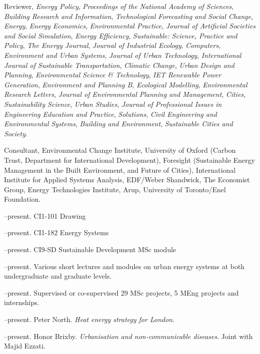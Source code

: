 \documentclass[11pt,a4paper]{article}
\begin{document}
\ind Reviewer, \emph{Energy Policy}, \emph{Proceedings of the National Academy of Sciences}, \emph{Building Research and Information}, \emph{Technological Forecasting and Social Change}, \emph{Energy}, \emph{Energy Economics}, \emph{Environmental Practice}, \emph{Journal of Artificial Societies and Social Simulation}, \emph{Energy Efficiency}, \emph{Sustainable: Science, Practice and Policy}, \emph{The Energy Journal}, \emph{Journal of Industrial Ecology}, \emph{Computers, Environment and Urban Systems}, \emph{Journal of Urban Technology}, \emph{International Journal of Sustainable Transportation}, \emph{Climatic Change}, \emph{Urban Design and Planning}, \emph{Environmental Science \& Technology}, \emph{IET Renewable Power Generation}, \emph{Environment and Planning B}, \emph{Ecological Modelling}, \emph{Environmental Research Letters}, \emph{Journal of Environmental Planning and Management}, \emph{Cities}, \emph{Sustainability Science}, \emph{Urban Studies}, \emph{Journal of Professional Issues in Engineering Education and Practice}, \emph{Solutions}, \emph{Civil Engineering and Environmental Systems}, \emph{Building and Environment}, \emph{Sustainable Cities and Society}.

\ind Consultant, Environmental Change Institute, University of Oxford (Carbon Trust, Department for International Development), Foresight (Sustainable Energy Management in the Built Environment, and Future of Cities), International Institute for Applied Systems Analysis, EDF/Weber Shandwick, The Economist Group, Energy Technologies Institute, Arup, University of Toronto/Enel Foundation.
\bigskip%

\newpage
\noindent{}%
%
--present.  CI{1-101} Drawing

--present.  CI{1-182} Energy Systems

--present.  CI{9-SD} Sustainable Development MSc module

--present. Various short lectures and modules on urban energy systems at both undergraduate and graduate levels.
 
--present. Supervised or co-supervised 29 MSc projects, 5 MEng projects and internships.

\bigskip
\noindent{}%
--present.  Peter North. \emph{Heat energy strategy for London}.

--present.  Honor Brixby. \emph{Urbanisation and non-communicable diseases}.  Joint with Majid Ezzati.
\end{document}

